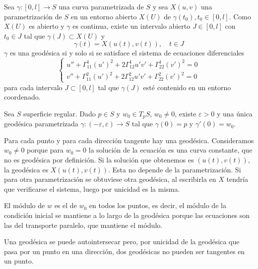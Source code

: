 \begin{proposition}
    Sea $\gamma : [0, l] \to S$ una curva parametrizada de $S$ y sea $X(u, v)$ una parametrización de $S$ en un entorno abierto $X(U)$ de $\gamma(t_0), t_0 \in [0, l]$.
    Como $X(U)$ es abierto y $\gamma$ es continua, existe un intervalo abierto $J \in [0, l]$ con $t_0 \in J$ tal que $\gamma(J) \subset X(U)$ y $$\gamma(t) = X(u(t), v(t)), \quad t \in J$$
    $\gamma$ es una geodésica si y solo si se satisface el sistema de ecuaciones diferenciales
    $$\left\{ \begin{array}{lcl}
            u'' + \Gamma^1_{11}(u')^2 + 2\Gamma^1_{12}u'v' + \Gamma^1_{22}(v')^2 = 0 \\
            v'' + \Gamma^2_{11}(u')^2 + 2\Gamma^2_{12}u'v' + \Gamma^2_{22}(v')^2 = 0
        \end{array}
        \right.$$
    para cada intervalo $J \subset [0, l]$ tal que $\gamma(J)$ esté contenido en un entorno coordenado.
\end{proposition}

\begin{proposition}
    Sea $S$ superficie regular.
    Dado $p \in S$ y $w_0 \in T_pS$, $w_0 \neq 0$, existe $\varepsilon > 0$ y una única geodésica parametrizada $\gamma : (-\varepsilon, \varepsilon) \to S$ tal que $\gamma(0) = p$ y $\gamma'(0) = w_0$.
\end{proposition}

\begin{remark}
    Para cada punto y para cada dirección tangente hay una geodésica.
    Consideramos $w_0 \neq 0$ porque para $w_0 = 0$ la solución de la ecuación es una curva constante, que no es geodésica por definición.
    Si la solución que obtenemos es $(u(t), v(t))$, la geodésica es $X(u(t), v(t))$.
    Esta no depende de la parametrización. Si para otra parametrización se obtuviese otra geodésica, al escribirla en $X$ tendría que verificarse el sistema, luego por unicidad es la misma.
\end{remark}

\begin{remark}
    El módulo de $w$ es el de $w_0$ en todos los puntos, es decir, el módulo de la condición inicial se mantiene a lo largo de la geodésica porque las ecuaciones son las del transporte paralelo, que mantiene el módulo.
\end{remark}

\begin{remark}
    Una geodésica se puede autointersecar pero, por unicidad de la geodésica que pasa por un punto en una dirección, dos geodésicas no pueden ser tangentes en un punto.
\end{remark}

